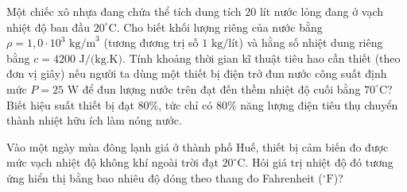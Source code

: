 \begin{ex}	Một chiếc xô nhựa đang chứa thể tích dung tích $20\text{ lít}$ nước lỏng đang ở vạch nhiệt độ ban đầu $20^\circ\text{C}$. Cho biết khối lượng riêng của nước bằng $\rho = 1,0 \cdot 10^3\text{ kg/m}^3$ (tương đương trị số $1\text{ kg/lít}$) và hằng số nhiệt dung riêng bằng $c = 4200\text{ J/(kg.K)}$. Tính khoảng thời gian kĩ thuật tiêu hao cần thiết (theo đơn vị giây) nếu người ta dùng một thiết bị điện trở đun nước công suất định mức $P = 25\text{ W}$ để đun lượng nước trên đạt đến thềm nhiệt độ cuối bằng $70^\circ\text{C}$? Biết hiệu suất thiết bị đạt $80\%$, tức chỉ có $80\%$ năng lượng điện tiêu thụ chuyển thành nhiệt hữu ích làm nóng nước.

	\par{}
\end{ex}

\begin{ex}	Vào một ngày mùa đông lạnh giá ở thành phố Huế, thiết bị cảm biến đo được mức vạch nhiệt độ không khí ngoài trời đạt $20^\circ\text{C}$. Hỏi giá trị nhiệt độ đó tương ứng hiển thị bằng bao nhiêu độ dóng theo thang đo Fahrenheit ($^\circ\text{F}$)?

	\par{}
\end{ex}

